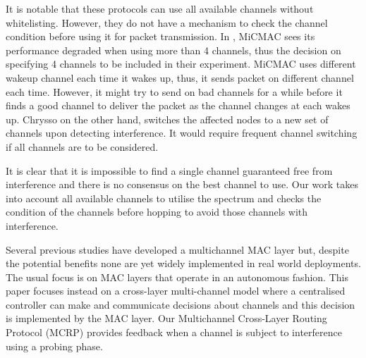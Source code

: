 It is notable that these protocols can use all available channels without whitelisting. However, they do not have a mechanism to check the channel condition before using it for packet transmission. In \cite{micmac}, MiCMAC sees its performance degraded when using more than 4 channels, thus the decision on specifying 4 channels to be included in their experiment. MiCMAC uses different wakeup channel each time it wakes up, thus, it sends packet on different channel each time. However, it might try to send on bad channels for a while before it finds a good channel to deliver the packet as the channel changes at each wakes up. Chrysso on the other hand, switches the affected nodes to a new set of channels upon detecting interference. It would require frequent channel switching if all channels are to be considered.

It is clear that it is impossible to find a single channel guaranteed free from interference and there is no consensus on the best channel to use. Our work takes into account all available channels to utilise the spectrum and checks the condition of the channels before hopping to avoid those channels with interference.

Several previous studies have developed a multichannel MAC layer but, despite the potential benefits none are yet widely implemented in real world deployments. The usual focus is on MAC layers that operate in an autonomous fashion. This paper focuses instead on a cross-layer multi-channel model where a centralised controller can make and communicate decisions about channels and this decision is implemented by the MAC layer. Our Multichannel Cross-Layer Routing Protocol (MCRP) provides feedback when a channel is subject to interference using a probing phase.


